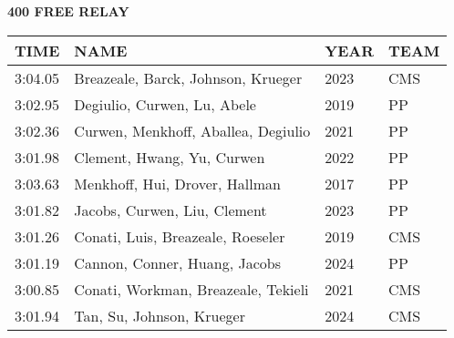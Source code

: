 \vspace{0.4cm}

\begin{center}
\begin{minipage}[t]{0.7\textwidth}
\centering
\textbf{400 FREE RELAY}\\[0.05cm]
\begin{tabular}{@{}p{1.8cm}p{2.8cm}p{1.2cm}p{1.4cm}@{}}
\hline
\textbf{TIME} & \textbf{NAME} & \textbf{YEAR} & \textbf{TEAM} \\
\hline
3:04.05 & Breazeale, Barck, Johnson, Krueger & 2023 & CMS \\
3:02.95 & Degiulio, Curwen, Lu, Abele & 2019 & PP \\
3:02.36 & Curwen, Menkhoff, Aballea, Degiulio & 2021 & PP \\
3:01.98 & Clement, Hwang, Yu, Curwen & 2022 & PP \\
3:03.63 & Menkhoff, Hui, Drover, Hallman & 2017 & PP \\
3:01.82 & Jacobs, Curwen, Liu, Clement & 2023 & PP \\
3:01.26 & Conati, Luis, Breazeale, Roeseler & 2019 & CMS \\
3:01.19 & Cannon, Conner, Huang, Jacobs & 2024 & PP \\
3:00.85 & Conati, Workman, Breazeale, Tekieli & 2021 & CMS \\
3:01.94 & Tan, Su, Johnson, Krueger & 2024 & CMS \\
\hline
\end{tabular}
\end{minipage}
\end{center}

\vspace{0.4cm}

